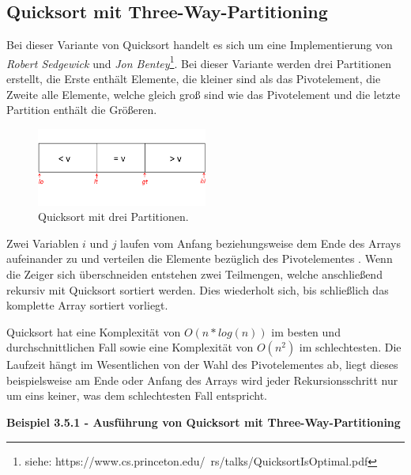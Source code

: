\subsection{Quicksort mit Three-Way-Partitioning}

Bei dieser Variante von Quicksort handelt es sich um eine Implementierung von \textit{Robert Sedgewick} und \textit{Jon Bentey}\footnote{siehe: https://www.cs.princeton.edu/~rs/talks/QuicksortIsOptimal.pdf}. Bei dieser Variante werden drei Partitionen erstellt, die Erste enthält Elemente, die kleiner sind als das Pivotelement, die Zweite alle Elemente, welche gleich groß sind wie das Pivotelement und die letzte Partition enthält die  Größeren.

\begin{figure}[htbp] 
	\centering
	\includegraphics[width=0.5\textwidth]{./img/quicksort-threeway}
	\caption{Quicksort mit drei Partitionen.}
\end{figure}

\noindent
Zwei Variablen $i$ und $j$ laufen vom Anfang beziehungsweise dem Ende des Arrays aufeinander zu und verteilen die Elemente bezüglich des Pivotelementes . Wenn die Zeiger sich überschneiden entstehen zwei Teilmengen, welche anschließend rekursiv mit Quicksort sortiert werden. Dies wiederholt sich, bis schließlich das komplette Array sortiert vorliegt.

Quicksort hat eine Komplexität von $O(n*log(n))$ im besten und durchschnittlichen Fall sowie eine Komplexität von $O(n^2)$ im schlechtesten. Die Laufzeit hängt im Wesentlichen von der Wahl des Pivotelementes  ab, liegt dieses beispielsweise am Ende oder Anfang des Arrays wird jeder Rekursionsschritt nur um eins keiner, was dem schlechtesten Fall entspricht.

\newpage

\textbf{Beispiel 3.5.1 - Ausführung von Quicksort mit Three-Way-Partitioning}